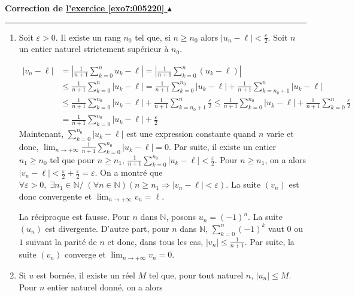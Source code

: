 \documentclass[11pt,a4paper]{article}
\newcommand{\Nn}{\mathbb{N}} \newcommand{\N}{\mathbb{N}}
\newcommand{\finexercice}{}
\newcommand{\noindication}{}
\newcounter{exo}
\newcommand{\correction}[1]{\hypertarget{cor7:#1}{}\label{cor7:#1}{\bf Correction de \hyperlink{exo7:#1}{l'exercice \ref{exo7:#1} $\blacktriangle$}}\vspace{1mm}\hrule\vspace{1mm}}
\newcommand{\finenonces}{\newpage}
\newcommand{\finindications}{\newpage}
\begin{document}
\finexercice

\finfiche

 \finenonces 



 \finindications 

\noindication
\noindication
\noindication
\noindication
\noindication
\noindication
\noindication
\noindication
\noindication
\noindication
\noindication
\noindication
\noindication
\noindication
\noindication
\noindication
\noindication
\noindication
\noindication
\noindication
\noindication
\noindication
\noindication
\noindication
\noindication
\noindication
\noindication
\noindication
\noindication
\noindication
\noindication
\noindication


\newpage

\correction{005220}
\begin{enumerate}
 \item  Soit $\varepsilon>0$. Il existe un rang $n_0$ tel que, si $n\geq n_0$ alors $|u_n-\ell|<\frac{\varepsilon}{2}$. Soit $n$ un entier naturel strictement supérieur à $n_0$.

\begin{align*}
|v_n-\ell|&=\left|\frac{1}{n+1}\sum_{k=0}^{n}u_k-\ell\right|=\left|\frac{1}{n+1}\sum_{k=0}^{n}(u_k-\ell)\right|\\
 &\leq\frac{1}{n+1}\sum_{k=0}^{n}|u_k-\ell|=\frac{1}{n+1}\sum_{k=0}^{n_0}|u_k-\ell|+\frac{1}{n+1}\sum_{k=n_0+1}^{n}|u_k-\ell|\\
 &\leq\frac{1}{n+1}\sum_{k=0}^{n_0}|u_k-\ell|+\frac{1}{n+1}\sum_{k=n_0+1}^{n}\frac{\varepsilon}{2}\leq\frac{1}{n+1}\sum_{k=0}^{n_0}|u_k-\ell|+\frac{1}{n+1}\sum_{k=0}^{n}\frac{\varepsilon}{2}\\
 &=\frac{1}{n+1}\sum_{k=0}^{n_0}|u_k-\ell|+\frac{\varepsilon}{2}
\end{align*}
Maintenant, $\sum_{k=0}^{n_0}|u_k-\ell|$ est une expression constante quand $n$ varie et donc, $\lim_{n\rightarrow +\infty}\frac{1}{n+1}\sum_{k=0}^{n_0}|u_k-\ell|=0$. Par suite, il existe un entier $n_1\geq n_0$ tel que pour $n\geq n_1$, $\frac{1}{n+1}\sum_{k=0}^{n_0}|u_k-\ell|<\frac{\varepsilon}{2}$.
Pour $n\geq n_1$, on a alors $|v_n-\ell|<\frac{\varepsilon}{2}+\frac{\varepsilon}{2}=\varepsilon$.
On a montré que $\forall\varepsilon>0,\;\exists n_1\in\Nn/\;(\forall n\in\Nn)(n\geq n_1\Rightarrow|v_n-\ell|<\varepsilon)$. La suite $(v_n)$ est donc convergente et $\lim_{n\rightarrow +\infty}v_n=\ell$.

\begin{center}
\end{center}
La réciproque est fausse. Pour $n$ dans $\Nn$, posons $u_n=(-1)^n$. La suite $(u_n)$ est divergente. D'autre part, pour $n$ dans $\Nn$, $\sum_{k=0}^{n}(-1)^k$ vaut $0$ ou $1$ suivant la parité de $n$ et donc, dans tous les cas, $|v_n|\leq\frac{1}{n+1}$. Par suite, la suite $(v_n)$ converge et $\lim_{n\rightarrow +\infty}v_n=0$.
 \item  Si $u$ est bornée, il existe un réel $M$ tel que, pour tout naturel $n$, $|u_n|\leq M$.
Pour $n$ entier naturel donné, on a alors


\end{enumerate}
\end{document}

